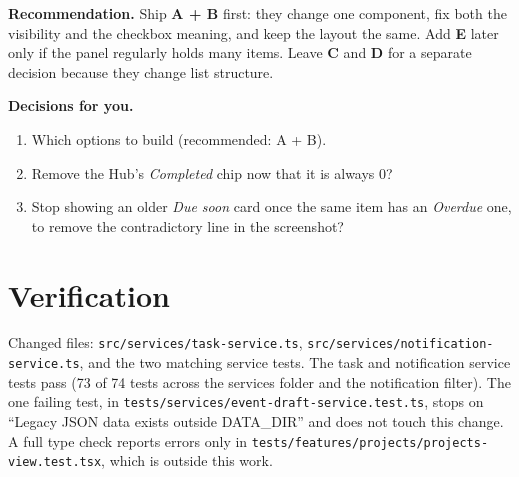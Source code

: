 ﻿\documentclass[10.5pt,a4paper]{article}
\begin{document}
\textbf{Recommendation.} Ship \textbf{A + B} first: they change one component, fix both the visibility and the checkbox meaning, and keep the layout the same. Add \textbf{E} later only if the panel regularly holds many items. Leave \textbf{C} and \textbf{D} for a separate decision because they change list structure.

\textbf{Decisions for you.}
\begin{enumerate}
  \item Which options to build (recommended: A + B).
  \item Remove the Hub's \emph{Completed} chip now that it is always 0?
  \item Stop showing an older \emph{Due soon} card once the same item has an \emph{Overdue} one, to remove the contradictory line in the screenshot?
\end{enumerate}

\section{Verification}

Changed files: \texttt{src/services/task-service.ts}, \texttt{src/services/notification-service.ts}, and the two matching service tests. The task and notification service tests pass (73 of 74 tests across the services folder and the notification filter). The one failing test, in \texttt{tests/services/event-draft-service.test.ts}, stops on ``Legacy JSON data exists outside DATA\_DIR'' and does not touch this change. A full type check reports errors only in \texttt{tests/features/projects/projects-view.test.tsx}, which is outside this work.
\end{document}
